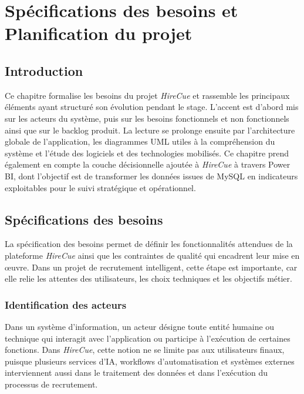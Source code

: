 \chapter{Sp\'ecifications des besoins et Planification du projet}

\section*{Introduction}

Ce chapitre formalise les besoins du projet \textit{HireCue} et rassemble les principaux éléments ayant structuré son évolution pendant le stage. L'accent est d'abord mis sur les acteurs du système, puis sur les besoins fonctionnels et non fonctionnels ainsi que sur le backlog produit. La lecture se prolonge ensuite par l'architecture globale de l'application, les diagrammes UML utiles à la compréhension du système et l'étude des logiciels et des technologies mobilisés. Ce chapitre prend également en compte la couche décisionnelle ajoutée à \textit{HireCue} à travers Power BI, dont l'objectif est de transformer les données issues de MySQL en indicateurs exploitables pour le suivi stratégique et opérationnel.

\section{Sp\'ecifications des besoins}

La spécification des besoins permet de définir les fonctionnalités attendues de la plateforme \textit{HireCue} ainsi que les contraintes de qualité qui encadrent leur mise en œuvre. Dans un projet de recrutement intelligent, cette étape est importante, car elle relie les attentes des utilisateurs, les choix techniques et les objectifs métier.

\subsection{Identification des acteurs}

Dans un système d'information, un acteur désigne toute entité humaine ou technique qui interagit avec l'application ou participe à l'exécution de certaines fonctions. Dans \textit{HireCue}, cette notion ne se limite pas aux utilisateurs finaux, puisque plusieurs services d'IA, workflows d'automatisation et systèmes externes interviennent aussi dans le traitement des données et dans l'exécution du processus de recrutement.

